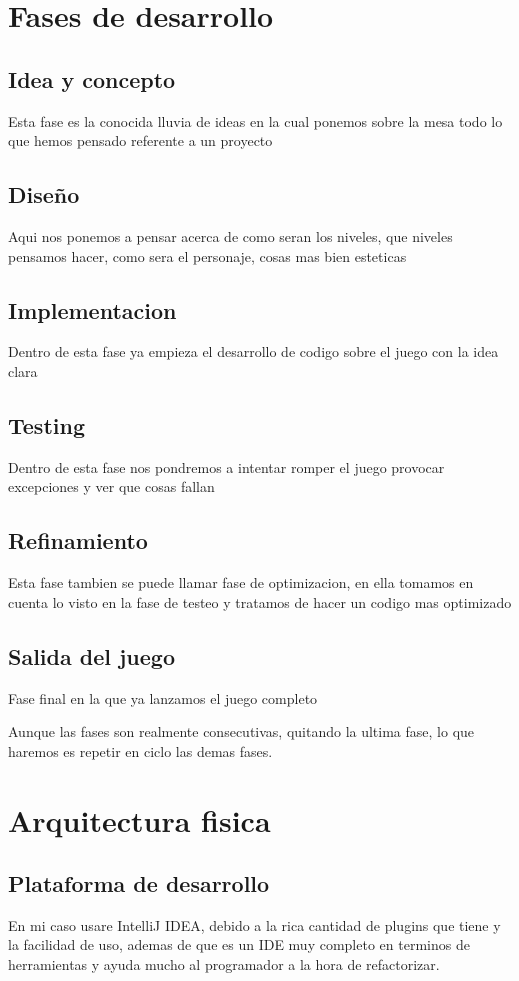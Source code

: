 \documentclass[a4paper]{article}
\begin{document}
    \clearpage
\section{Fases de desarrollo}

\subsection{Idea y concepto}
Esta fase es la conocida lluvia de ideas en la cual ponemos sobre la mesa todo lo que hemos pensado referente a un proyecto
\subsection{Diseño}
Aqui nos ponemos a pensar acerca de como seran los niveles, que niveles pensamos hacer, como sera el personaje, cosas mas bien esteticas
\subsection{Implementacion}
Dentro de esta fase ya empieza el desarrollo de codigo sobre el juego con la idea clara
\subsection{Testing}
Dentro de esta fase nos pondremos a intentar romper el juego provocar excepciones y ver que cosas fallan
\subsection{Refinamiento}
Esta fase tambien se puede llamar fase de optimizacion, en ella tomamos en cuenta lo visto en la fase de testeo y tratamos de hacer un codigo mas optimizado
\subsection{Salida del juego}
Fase final en la que ya lanzamos el juego completo

Aunque las fases son realmente consecutivas, quitando la ultima fase, lo que haremos es repetir en ciclo las demas fases.    

\clearpage
\section{Arquitectura fisica}
\subsection{Plataforma de desarrollo}
En mi caso usare IntelliJ IDEA, debido a la rica cantidad de plugins que tiene y la facilidad de uso, ademas de que es un IDE muy completo en terminos de herramientas y ayuda mucho al programador a la hora de refactorizar.
\clearpage
\end{document}
